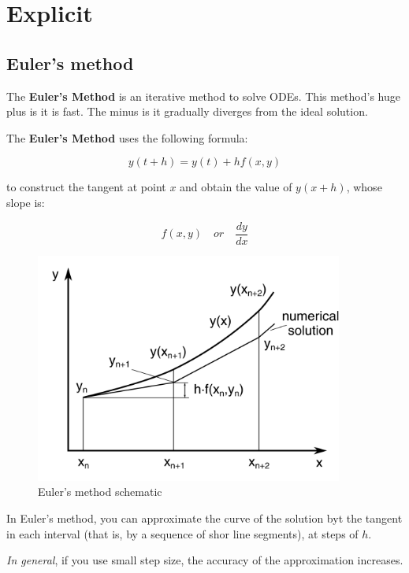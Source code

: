 \documentclass[10pt,b5paper,titlepage]{book}
\begin{document}
\section{Explicit}

\subsection{Euler's method}
The \textbf{Euler's Method} is an iterative method to solve ODEs. This method's
huge plus is it is fast. The minus is it gradually diverges from the ideal solution.

The \textbf{Euler's Method} uses the following formula:

\begin{equation}
    y(t + h) = y(t) + h f(x,y)
\end{equation}

to construct the tangent at point $ x $ and obtain the value of $ y(x + h) $,
whose slope is:

\begin{equation}
    f(x,y) \quad or \quad \frac{dy}{dx}
\end{equation}

\begin{figure}[ht]
    \centering
    \includegraphics[width=0.90\textwidth]{img/Euler.png}
    \caption{Euler's method schematic}
    \label{fig:euler-png}
\end{figure}

In Euler's method, you can approximate the curve of the solution byt the tangent
in each interval (that is, by a sequence of shor line segments), at steps of $ h $.

\textit{In general}, if you use small step size, the accuracy of the approximation
increases.
\end{document}
